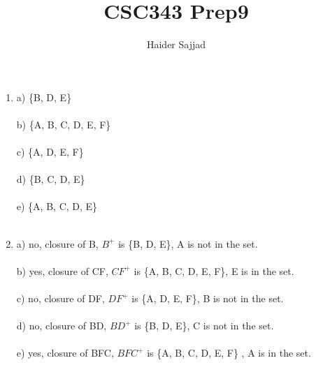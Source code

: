\documentclass{article}
\begin{document}
\title{CSC343 Prep9}
\author{Haider Sajjad}
\maketitle






\begin{enumerate}
    \item %
    a) \{B, D, E\} \\ \\
    b) \{A, B, C, D, E, F\} \\ \\
	c) \{A, D, E, F\} \\ \\
	d) \{B, C, D, E\} \\ \\
    e) \{A, B, C, D, E\} \\ \\
      
    \item %
    a) no, closure of B, $B^{+}$ is \{B, D, E\}, A is not in the set. \\ \\
    b) yes, closure of CF, $CF^{+}$ is \{A, B, C, D, E, F\}, E is in the set. \\ \\
	c) no, closure of DF, $DF^{+}$ is \{A, D, E, F\}, B is not in the set. \\ \\
	d) no, closure of BD, $BD^{+}$ is \{B, D, E\}, C is not in the set. \\ \\
    e) yes, closure of BFC, $BFC^{+}$ is \{A, B, C, D, E, F\} , A is in the set. \\ \\
       

\end{enumerate}
\end{document}
